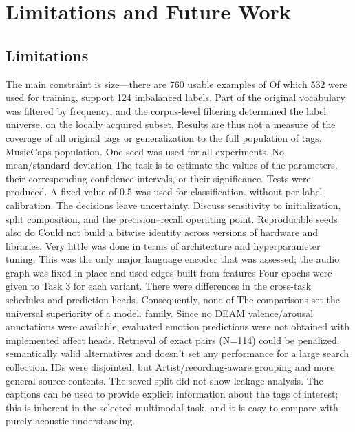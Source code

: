 \documentclass[10pt,twocolumn,letterpaper]{article}
\begin{document}
\section{Limitations and Future Work}
\subsection{Limitations}
The main constraint is size---there are 760 usable examples of Of which 532 were used for training, support 124 imbalanced labels. Part of the original vocabulary was filtered by frequency, and the corpus-level filtering determined the label universe. on the locally acquired subset. Results are thus not a measure of the coverage of all original tags or generalization to the full population of tags, MusicCaps population. One seed was used for all experiments. No mean/standard-deviation The task is to estimate the values of the parameters, their corresponding confidence intervals, or their significance. Tests were produced. A fixed value of 0.5 was used for classification. without per-label calibration. The decisions leave uncertainty. Discuss sensitivity to initialization, split composition, and the precision--recall operating point. Reproducible seeds also do Could not build a bitwise identity across versions of hardware and libraries. Very little was done in terms of architecture and hyperparameter tuning. This was the only major language encoder that was assessed; the audio graph was fixed in place and used edges built from features Four epochs were given to Task 3 for each variant. There were differences in the cross-task schedules and prediction heads. Consequently, none of The comparisons set the universal superiority of a model. family. Since no DEAM valence/arousal annotations were available, evaluated emotion predictions were not obtained with implemented affect heads. Retrieval of exact pairs (N=114) could be penalized. semantically valid alternatives and doesn't set any performance for a large search collection. IDs were disjointed, but Artist/recording-aware grouping and more general source contents. The saved split did not show leakage analysis. The captions can be used to provide explicit information about the tags of interest; this is inherent in the selected multimodal task, and it is easy to compare with purely acoustic understanding.
\end{document}
